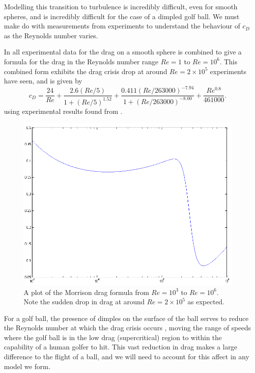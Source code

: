 Modelling this transition to turbulence is incredibly difficult, even for smooth spheres, and is 
incredibly difficult for the case of a dimpled golf ball. We must make do with measurements from 
experiments to understand the behaviour of $c_D$ as the Reynolds number varies.

In \citet{Morrison2010} all experimental data for the drag on a smooth sphere is combined to give a
formula for the drag in the Reynolds number range $Re = 1$ to $Re = 10^6$. This combined
form exhibits the drag crisis drop at around $Re = 2\times10^5$ experiments have seen, and is given by
\begin{equation} \label{drag-m}
c_D = \frac{24}{Re} + \frac{2.6(Re/5)}{1 + (Re/5)^{1.52}} + \frac{0.411(Re/263000)^{-7.94}}{1+(Re/263000)^{-8.00}}
+ \frac{Re^{0.8}}{461000} .
\end{equation}
using experimental results found from \citet{schlichting1968boundary}.
\begin{figure}[h]
\centering
\includegraphics[scale=0.7]{../images/morrison-drag.png}
\caption[Plot of the Morrison drag formula]{A plot of the Morrison drag formula from $Re = 10^3$ to
$Re=10^6$. Note the sudden drop in drag at around $Re = 2\times10^5$ as expected.}
\end{figure}

For a golf ball, the presence of dimples on the surface of the ball serves to reduce the Reynolds
number at which the drag crisis occurs \citet{Bearman1976}, moving the range of speeds where the golf
ball is in the low drag (supercritical) region to within the capability of a human golfer to hit. This
vast reduction in drag makes a large difference to the flight of a ball, and we will need to account
for this affect in any model we form.

